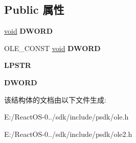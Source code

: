 \subsection*{Public 属性}
\begin{DoxyCompactItemize}
\item 
\mbox{\label{struct___o_l_e_s_t_r_e_a_m_v_t_b_l_a731209690b00707522ca714d74bf2dc1}} 
\hyperlink{interfacevoid}{void} {\bfseries D\+W\+O\+RD}
\item 
\mbox{\label{struct___o_l_e_s_t_r_e_a_m_v_t_b_l_ad21d5c3f202699887bb9ddf921a04264}} 
O\+L\+E\+\_\+\+C\+O\+N\+ST \hyperlink{interfacevoid}{void} {\bfseries D\+W\+O\+RD}
\item 
\mbox{\label{struct___o_l_e_s_t_r_e_a_m_v_t_b_l_a8ab60c4843cd5f9e67c1b4730f1c2450}} 
{\bfseries L\+P\+S\+TR}
\item 
\mbox{\label{struct___o_l_e_s_t_r_e_a_m_v_t_b_l_a846dd736c74b03fcf8706e9d33db76bf}} 
{\bfseries D\+W\+O\+RD}
\end{DoxyCompactItemize}


该结构体的文档由以下文件生成\+:\begin{DoxyCompactItemize}
\item 
E\+:/\+React\+O\+S-\/0../sdk/include/psdk/ole.\+h\item 
E\+:/\+React\+O\+S-\/0../sdk/include/psdk/ole2.\+h\end{DoxyCompactItemize}
